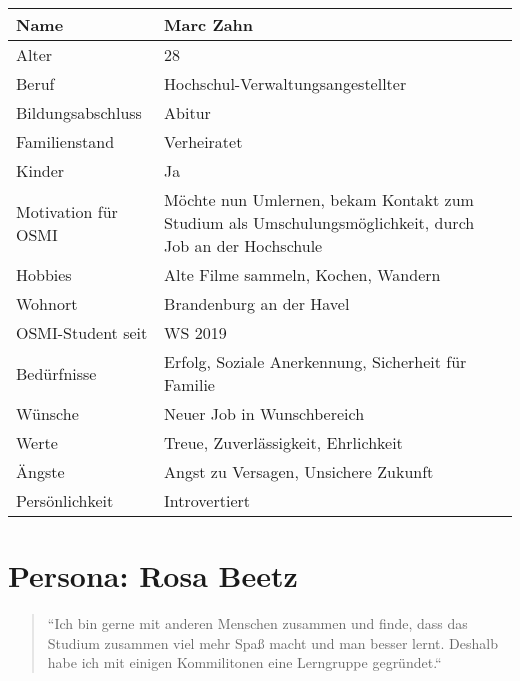 \documentclass{article}
\begin{document}
\begin{center}
	\begin{tabularx}{\textwidth}{|l|X|}
		\hline
		Name                & Marc Zahn                                           \\
		\hline
		Alter               & 28                                                  \\
		\hline
		Beruf               & Hochschul-Verwaltungsangestellter                   \\
		\hline
		Bildungsabschluss   & Abitur                                              \\
		\hline
		Familienstand       & Verheiratet                                         \\
		\hline
		Kinder              & Ja                                                  \\
		\hline
		Motivation für OSMI & Möchte nun Umlernen, bekam Kontakt zum Studium als
		Umschulungsmöglichkeit, durch Job an der Hochschule                       \\
		\hline
		Hobbies             & Alte Filme sammeln, Kochen, Wandern                 \\
		\hline
		Wohnort             & Brandenburg an der Havel                            \\
		\hline
		OSMI-Student seit   & WS 2019                                             \\
		\hline
		Bedürfnisse         & Erfolg, Soziale Anerkennung, Sicherheit für Familie \\
		\hline
		Wünsche             & Neuer Job in Wunschbereich                          \\
		\hline
		Werte               & Treue, Zuverlässigkeit, Ehrlichkeit                 \\
		\hline
		Ängste              & Angst zu Versagen, Unsichere Zukunft                \\
		\hline
		Persönlichkeit      & Introvertiert                                       \\
		\hline
	\end{tabularx}
\end{center}

\newpage

\section{Persona: Rosa Beetz}

\begin{quote}
	\large{``Ich bin gerne mit anderen Menschen zusammen und finde, dass das Studium
		zusammen viel mehr Spaß macht und man besser lernt. Deshalb habe ich mit einigen
		Kommilitonen eine Lerngruppe gegründet.``}
\end{quote}
\end{document}
